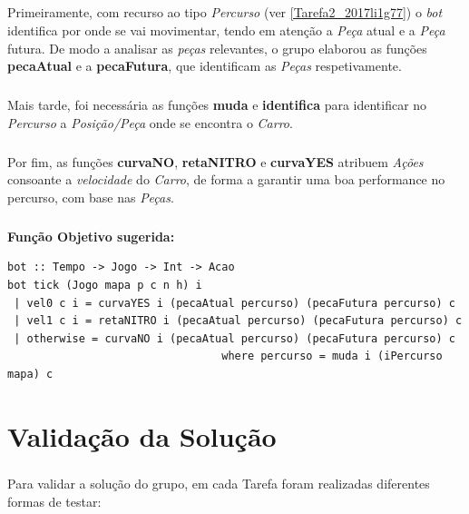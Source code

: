 \documentclass[12pt,a4paper]{report}
\begin{document}
\paragraph{} Primeiramente, com recurso ao tipo \textit{Percurso} (ver \ref{Tarefa2_2017li1g77}) o \textit{bot} identifica por onde se vai movimentar, tendo em atenção a \textit{Peça} atual e a \textit{Peça} futura. De modo a analisar as \textit{peças} relevantes, o grupo elaborou as funções \textbf{pecaAtual} e a \textbf{pecaFutura}, que identificam as \textit{Peças} respetivamente.

\paragraph{} Mais tarde, foi necessária as funções \textbf{muda} e \textbf{identifica} para identificar no \textit{Percurso} a \textit{Posição/Peça} onde se encontra o \textit{Carro}.

\paragraph{} Por fim, as funções \textbf{curvaNO}, \textbf{retaNITRO} e \textbf{curvaYES} atribuem \textit{Ações} consoante a \textit{velocidade} do \textit{Carro}, de forma a garantir uma boa performance no percurso, com base nas \textit{Peças}.

\paragraph{}\textbf{Função Objetivo sugerida:}

\begin{verbatim}
bot :: Tempo -> Jogo -> Int -> Acao
bot tick (Jogo mapa p c n h) i 
 | vel0 c i = curvaYES i (pecaAtual percurso) (pecaFutura percurso) c
 | vel1 c i = retaNITRO i (pecaAtual percurso) (pecaFutura percurso) c
 | otherwise = curvaNO i (pecaAtual percurso) (pecaFutura percurso) c
                                 where percurso = muda i (iPercurso mapa) c
\end{verbatim}

\newpage
\chapter{Validação da Solução}

\paragraph{} Para validar a solução do grupo, em cada Tarefa foram realizadas diferentes formas de testar:
\end{document}
